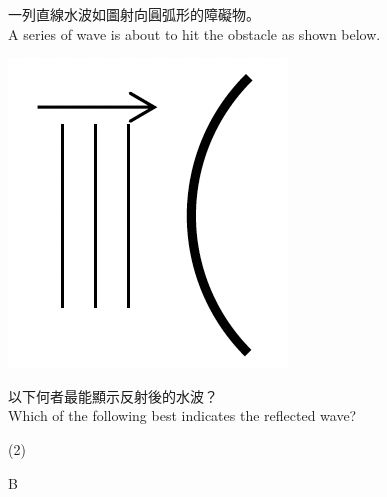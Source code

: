 {
    一列直線水波如圖射向圓弧形的障礙物。\\A series of wave is about to hit the obstacle as shown below.
    \par{\par\centering\includegraphics[width=.2\textwidth]{./img/ch2_weekend_mc_2024-05-31-18-55-50.png}\par}
    以下何者最能顯示反射後的水波？\\Which of the following best indicates the reflected wave?
    \begin{tasks}(2)
        \task {}
        \task {}
        \task {}
        \task {}
    \end{tasks}
}{B}




